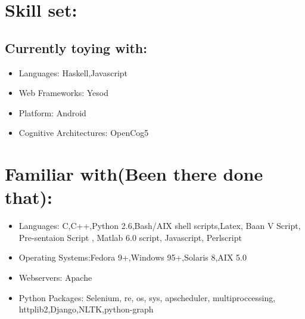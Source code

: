 \section {Skill set:}
	\subsection {Currently toying with:}
		\begin{itemize}
			\item Languages: Haskell,Javascript

	 		\item Web Frameworks: Yesod

			\item Platform: Android

	 		\item Cognitive Architectures: OpenCog5
		\end{itemize}
		
\section {Familiar with(Been there done that):}
	\begin{itemize}
	
		\item Languages: C,C++,Python 2.6,Bash/AIX shell scripts,Latex, Baan V Script, Pre-sentaion Script , Matlab 6.0 script, Javascript, Perlscript

		\item Operating Systems:Fedora 9+,Windows 95+,Solaris 8,AIX 5.0

		\item Webservers: Apache

		\item Python Packages: Selenium, re, os, sys, apscheduler, multiproccessing, httplib2,Django,NLTK,python-graph
	\end{itemize}
